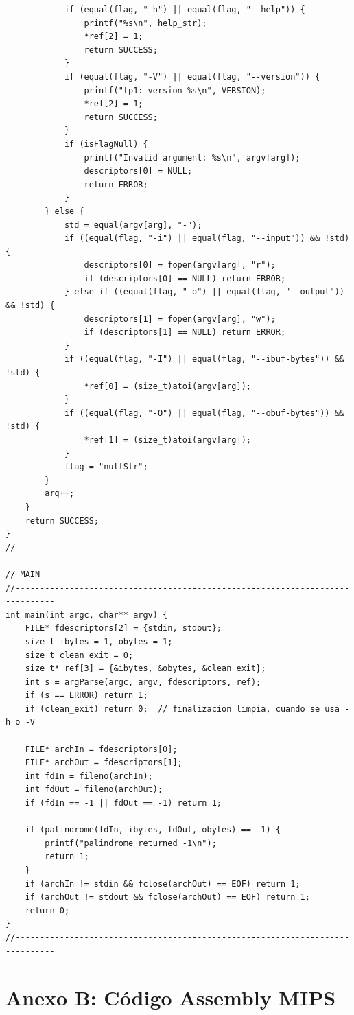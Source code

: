 \documentclass[a4paper,10pt]{article}
\begin{document}
\begin{lstlisting}
            if (equal(flag, "-h") || equal(flag, "--help")) {
                printf("%s\n", help_str);
                *ref[2] = 1;
                return SUCCESS;
            }
            if (equal(flag, "-V") || equal(flag, "--version")) {
                printf("tp1: version %s\n", VERSION);
                *ref[2] = 1;
                return SUCCESS;
            }
            if (isFlagNull) {
                printf("Invalid argument: %s\n", argv[arg]);
                descriptors[0] = NULL;
                return ERROR;
            }
        } else {
            std = equal(argv[arg], "-");
            if ((equal(flag, "-i") || equal(flag, "--input")) && !std) {
                descriptors[0] = fopen(argv[arg], "r");
                if (descriptors[0] == NULL) return ERROR;
            } else if ((equal(flag, "-o") || equal(flag, "--output")) && !std) {
                descriptors[1] = fopen(argv[arg], "w");
                if (descriptors[1] == NULL) return ERROR;
            }
            if ((equal(flag, "-I") || equal(flag, "--ibuf-bytes")) && !std) {
                *ref[0] = (size_t)atoi(argv[arg]);
            }
            if ((equal(flag, "-O") || equal(flag, "--obuf-bytes")) && !std) {
                *ref[1] = (size_t)atoi(argv[arg]);
            }
            flag = "nullStr";
        }
        arg++;
    }
    return SUCCESS;
}
//------------------------------------------------------------------------------
// MAIN
//------------------------------------------------------------------------------
int main(int argc, char** argv) {
    FILE* fdescriptors[2] = {stdin, stdout};
    size_t ibytes = 1, obytes = 1;
    size_t clean_exit = 0;
    size_t* ref[3] = {&ibytes, &obytes, &clean_exit};
    int s = argParse(argc, argv, fdescriptors, ref);
    if (s == ERROR) return 1;
    if (clean_exit) return 0;  // finalizacion limpia, cuando se usa -h o -V

    FILE* archIn = fdescriptors[0];
    FILE* archOut = fdescriptors[1];
    int fdIn = fileno(archIn);
    int fdOut = fileno(archOut);
    if (fdIn == -1 || fdOut == -1) return 1;

    if (palindrome(fdIn, ibytes, fdOut, obytes) == -1) {
        printf("palindrome returned -1\n");
        return 1;
    }
    if (archIn != stdin && fclose(archOut) == EOF) return 1;
    if (archOut != stdout && fclose(archOut) == EOF) return 1;
    return 0;
}
//------------------------------------------------------------------------------
        \end{lstlisting}
        \section{Anexo B: Código Assembly MIPS}
\end{document}
